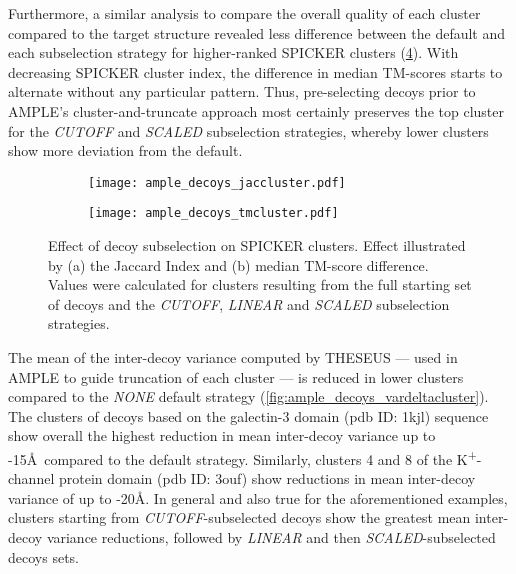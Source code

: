 Furthermore, a similar analysis to compare the overall quality of each cluster compared to the target structure revealed less difference between the default and each subselection strategy for higher-ranked SPICKER clusters (\cref{fig:ample_decoys_tmcluster}). With decreasing SPICKER cluster index, the difference in median TM-scores starts to alternate without any particular pattern. Thus, pre-selecting decoys prior to AMPLE's cluster-and-truncate approach most certainly preserves the top cluster for the \textit{CUTOFF} and \textit{SCALED} subselection strategies, whereby lower clusters show more deviation from the default.

\begin{figure}[H]
    \centering
    \begin{subfigure}[b]{\textwidth}
        \texttt{[image: ample\_decoys\_jaccluster.pdf]}
        \caption{}
        \label{fig:ample_decoys_jaccluster}
    \end{subfigure}
\end{figure}

\begin{figure}[H]\ContinuedFloat
    \begin{subfigure}[b]{\textwidth}
        \texttt{[image: ample\_decoys\_tmcluster.pdf]}
        \caption{}
        \label{fig:ample_decoys_tmcluster}
    \end{subfigure}
    \caption[Effect of decoy subselection on SPICKER clusters]{Effect of decoy subselection on SPICKER clusters. Effect illustrated by (a) the Jaccard Index and (b) median TM-score difference. Values were calculated for clusters resulting from the full starting set of decoys and the \textit{CUTOFF}, \textit{LINEAR} and \textit{SCALED} subselection strategies.}
\end{figure}

The mean of the inter-decoy variance computed by THESEUS --- used in AMPLE to guide truncation of each cluster --- is reduced in lower clusters compared to the \textit{NONE} default strategy (\cref{fig:ample_decoys_vardeltacluster}). The clusters of decoys based on the galectin-3 domain (\gls{pdb} ID: 1kjl) sequence show overall the highest reduction in mean inter-decoy variance up to -15\AA\ compared to the default strategy. Similarly, clusters 4 and 8 of the K\textsuperscript{+}-channel protein domain (\gls{pdb} ID: 3ouf) show reductions in mean inter-decoy variance of up to -20\AA. In general and also true for the aforementioned examples, clusters starting from \textit{CUTOFF}-subselected decoys show the greatest mean inter-decoy variance reductions, followed by \textit{LINEAR} and then \textit{SCALED}-subselected decoys sets.

